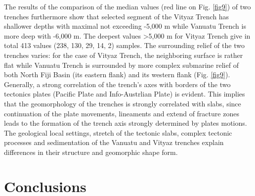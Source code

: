 \documentclass[USenglish]{article}
\begin{document}
The results of the comparison of the median values (red line on Fig. \ref{fig9}) of two trenches furthermore show that selected segment of the Vityaz Trench has shallower depths with maximal not exceeding -5,000 m while Vanuatu Trench is more deep with -6,000 m. The deepest values >5,000 m for Vityaz Trench give in total 413 values (238, 130, 29, 14, 2) samples. The surrounding relief of the two trenches varies: for the case of Vityaz Trench, the neighboring surface is rather flat while Vanuatu Trench is surrounded by more complex submarine relief of both North Fiji Basin (its eastern flank) and its western flank (Fig. \ref{fig9}).\\
 Generally, a strong correlation of the trench's axes with borders of the two tectonics plates (Pacific Plate and Info-Austrlian Plate) is evident. This implies that the geomorphology of the trenches is strongly correlated with slabs, since continuation of the plate movements, lineaments and extend of fracture zones leads to the formation of the trench axis strongly determined by plates motions. The geological local settings, stretch of the tectonic slabs, complex tectonic processes and sedimentation of the Vanuatu and Vityaz trenches explain differences in their structure and geomorphic shape form.

\section{Conclusions}
\end{document}
